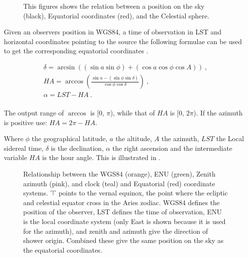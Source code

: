 \begin{figure}
    \centering
    
    \caption{This figures shows the relation between a position on the
             sky (black), Equatorial coordinates (red), and the
             Celestial sphere.}
    \label{fig:equatorial}
\end{figure}

Given an observers position in WGS84, a time of observation in LST and
horizontal coordinates pointing to the source the following formulae can
be used to get the corresponding equatorial coordinates \cite[p.
37]{duffet-smith:1990aa}.

\begin{equation}
    \begin{array}{l}
        \delta = \arcsin{\left((\sin{a} \sin{\phi}) +
                               (\cos{a} \cos{\phi} \cos{A})\right)} \ , \\
        \mathit{HA} = \arccos{\left(\frac{\sin{a} - (\sin{\phi} \sin{\delta})}
                                         {\cos{\phi} \cos{\delta}}\right)} \ , \\
        \alpha = \mathit{LST} - \mathit{HA} \ . \\
    \end{array}
\end{equation}

The output range of $\arccos$ is [0, $\pi$), while that of $\mathit{HA}$ is
[0, $2\pi$). If the azimuth is positive use: $\mathit{HA} = 2 \pi -
\mathit{HA}$.

Where $\phi$ the geographical latitude, $a$ the altitude, $A$ the
azimuth, $\mathit{LST}$ the Local sidereal time, $\delta$ is the
declination, $\alpha$ the right ascension and the intermediate variable
$\mathit{HA}$ is the hour angle. This is illustrated in
.


\begin{figure}
    \centering
    
    \caption{Relationship between the WGS84 (orange), ENU (green),
             Zenith azimuth (pink), and clock (teal) and Equatorial
             (red) coordinate systems. $\vernal$ points to the vernal
             equinox, the point where the ecliptic and celestial equator
             cross in the Aries zodiac. WGS84 defines the position of
             the observer, LST defines the time of observation, ENU is
             the local coordinate system (only East is shown because it
             is used for the azimuth), and zenith and azimuth give the
             direction of shower origin. Combined these give the same
             position on the sky as the equatorial coordinates.}
    \label{fig:wgs84_zenazi_lst_equatorial}
\end{figure}


